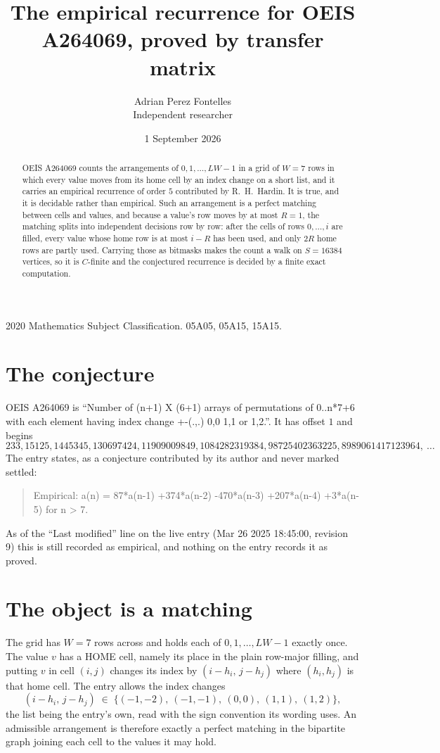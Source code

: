 \documentclass[11pt,a4paper]{article}
\title{The empirical recurrence for OEIS A264069, proved by transfer matrix}
\author{Adrian Perez Fontelles\\ \small Independent researcher}
\date{1 September 2026}
\theoremstyle{plain}
\theoremstyle{definition}
\begin{document}
\maketitle

\begin{abstract}
OEIS A264069 counts the arrangements of $0,1,\dots,LW-1$ in a grid of $W=7$ rows in which
every value moves from its home cell by an index change on a short list, and it carries an
empirical recurrence of order $5$ contributed by R.~H.~Hardin. It is true, and it is
decidable rather than empirical. Such an arrangement is a perfect matching between cells and
values, and because a value's row moves by at most $R=1$, the matching splits into
independent decisions row by row: after the cells of rows $0,\dots,i$ are filled,
every value whose home row is at most $i-R$ has been used, and only $2R$ home rows are
partly used. Carrying those as bitmasks makes the count a walk on $S=16384$ vertices, so it is
$C$-finite and the conjectured recurrence is decided by a finite exact computation.
\end{abstract}

\noindent\small 2020 Mathematics Subject Classification. 05A05, 05A15, 15A15.\normalsize

\section{The conjecture}

OEIS A264069 is ``Number of (n+1) X (6+1) arrays of permutations of 0..n*7+6 with each element having index change +-(.,.) 0,0 1,1 or 1,2.''. It has offset $1$ and begins
\[
233, 15125, 1445345, 130697424, 11909009849, 1084282319384, 98725402363225, 8989061417123964,\ \dots
\]
The entry states, as a conjecture contributed by its author and never marked settled:
\begin{quote}
Empirical: a(n) = 87*a(n-1) +374*a(n-2) -470*a(n-3) +207*a(n-4) +3*a(n-5) for n > 7.
\end{quote}
As of the ``Last modified'' line on the live entry (Mar 26 2025 18:45:00, revision 9) this is still
recorded as empirical, and nothing on the entry records it as proved.

\section{The object is a matching}

The grid has $W=7$ rows across and holds each of $0,1,\dots,LW-1$ exactly once. The value
$v$ has a HOME cell, namely its place in the plain row-major filling, and putting $v$ in cell
$(i,j)$ changes its index by $(i-h_i,\,j-h_j)$ where $(h_i,h_j)$ is that home cell. The entry
allows the index changes
\[
(i-h_i,\,j-h_j)\;\in\;\{(-1,-2),\ (-1,-1),\ (0,0),\ (1,1),\ (1,2)\},
\]
the list being the entry's own, read with the sign convention its wording uses. An admissible
arrangement is therefore exactly a perfect matching in the bipartite graph joining each cell to
the values it may hold.
\end{document}
